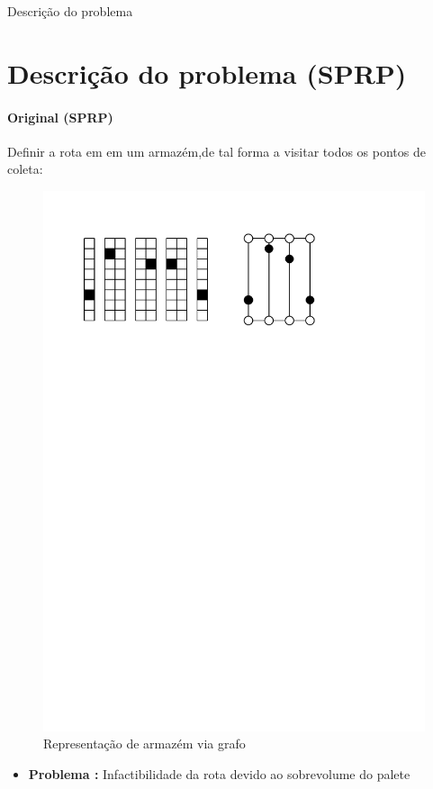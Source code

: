 \documentclass[12pt]{beamer}
\begin{document}
	\begin{frame}{Descri\c{c}\~ao do problema}
	\section{Descri\c{c}\~ao do problema (SPRP)}
	\framesubtitle{Original (SPRP)}	
		Definir a rota em em um armaz\'em,de tal forma a visitar todos os pontos de coleta:
			\begin{figure}
			\pause
			\includegraphics[width=1\linewidth]{CD_1}
			\caption{Representa\c{c}\~ao de armaz\'em via grafo}
			
		\end{figure}
	\pause
	\begin{itemize}
		\item {\bfseries Problema :}
		Infactibilidade da rota devido ao sobrevolume do palete
	\end{itemize}
	\end{frame}
\end{document}
